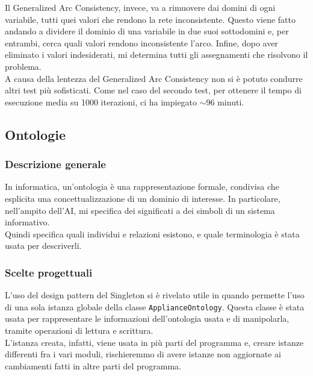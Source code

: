 \documentclass[12pt, letterpaper]{article}
\begin{document}
\noindent Il Generalized Arc Consistency, invece, va a rimuovere dai domini di ogni variabile, tutti quei valori
che rendono la rete inconsistente. Questo viene fatto andando a dividere il dominio di una variabile in due suoi
sottodomini e, per entrambi, cerca quali valori rendono inconsistente l'arco.
Infine, dopo aver eliminato i valori indesiderati, mi determina tutti gli assegnamenti che risolvono il problema. \\

\noindent A causa della lentezza del Generalized Arc Consistency non si è
potuto condurre altri test più sofisticati. Come nel caso del secondo
test, per ottenere il tempo di esecuzione media su 1000 iterazioni, ci ha impiegato
$\sim96$ minuti.


\subsection{Ontologie}

\subsubsection{Descrizione generale}

In informatica, un'ontologia è una rappresentazione formale, condivisa che esplicita
una concettualizzazione di un dominio di interesse. In particolare, nell'ampito dell'AI,
mi specifica dei significati a dei simboli di un sistema informativo. \\

\noindent Quindi specifica quali individui e relazioni esistono, e quale
terminologia è stata usata per descriverli.


\subsubsection{Scelte progettuali}

\noindent L'uso del design pattern del Singleton si è rivelato utile in quando permette l'uso di
una sola istanza globale della classe \texttt{ApplianceOntology}. Questa classe è stata usata per
rappresentare le informazioni dell'ontologia usata e di manipolarla, tramite operazioni di lettura e
scrittura. \\

\noindent L'istanza creata, infatti, viene usata in più parti del programma e, creare istanze differenti
fra i vari moduli, rischieremmo di avere istanze non aggiornate ai cambiamenti fatti in altre parti del
programma. \\
\end{document}
